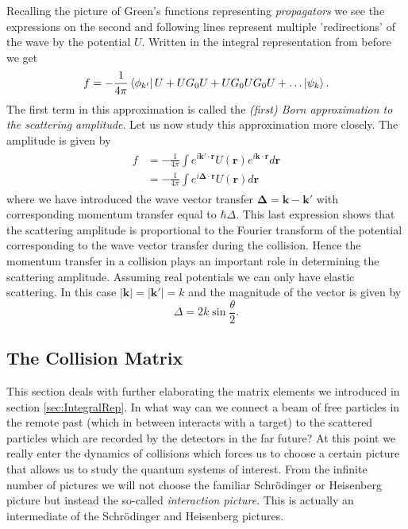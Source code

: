 \documentclass[11pt]{article}
\numberwithin{equation}{section}
\begin{document}
Recalling the picture of Green's functions representing \emph{propagators} we see the expressions on the second and following lines represent multiple 'redirections' of the wave by the potential $U$.
Written in the integral representation from before we get
\begin{equation}
	f = -\frac{1}{4 \pi}\bra{\phi_{k'}}U + UG_0U + UG_0UG_0U + \ldots \ket{\psi_k}.
\end{equation}
The first term in this approximation is called the \emph{(first) Born approximation to the scattering amplitude}. Let us now study this approximation more closely. The amplitude is given by
\begin{align}
\begin{split}
f &= -\frac{1}{4\pi} \int e^{i \mathbf{k}' \cdot \mathbf{r}	} U(\mathbf{r}) e^{i \mathbf{k} \cdot \mathbf{r}	}d\mathbf{r}\\
&= -\frac{1}{4\pi} \int e^{i \mathbf{\Delta \cdot r}}U(\mathbf{r})d\mathbf{r}
\end{split}
\end{align}
where we have introduced the wave vector transfer $\mathbf{\Delta} = \mathbf{k} - \mathbf{k}'$ with corresponding momentum transfer equal to $\hbar\Delta$. This last expression shows that the scattering amplitude is proportional to the Fourier transform of the potential corresponding to the wave vector transfer during the collision. Hence the momentum transfer in a collision plays an important role in determining the scattering amplitude. Assuming real potentials we can only have elastic scattering. In this case $|\mathbf{k}| = |\mathbf{k}'| = k$ and the magnitude of the vector is given by
\begin{equation}
\Delta = 2k\sin\frac{\theta}{2}.	
\end{equation}




\subsection{The Collision Matrix}
This section deals with further elaborating the matrix elements we introduced in section \ref{sec:IntegralRep}. In what way can we connect a beam of free particles in the remote past (which in between interacts with a target) to the scattered particles which  are recorded by the detectors in the far future? At this point we really enter the dynamics of collisions which forces us to choose a certain picture that allows us to study the quantum systems of interest. From the infinite number of pictures we will not choose the familiar Schr\"odinger or Heisenberg picture but instead the so-called \emph{interaction picture}. This is actually an intermediate of the Schr\"odinger and Heisenberg pictures.\\
\end{document}
